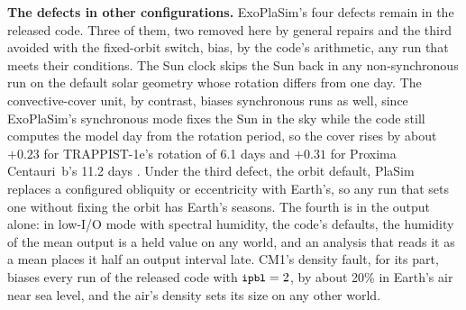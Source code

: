 \textbf{The defects in other configurations.} ExoPlaSim's four defects remain in the released code. Three of them,
two removed here by general repairs and the third avoided with the fixed-orbit switch, bias, by the code's
arithmetic, any run that meets their conditions. The Sun clock skips the Sun back in any non-synchronous run on the default solar geometry whose
rotation differs from one day. The convective-cover unit, by contrast, biases synchronous runs as well, since
ExoPlaSim's synchronous mode fixes the Sun in the sky while the code still computes the model day from the rotation period, so
the cover rises by about $+0.23$ for TRAPPIST-1e's rotation of 6.1 days
\autocite{yang2023cloud} and $+0.31$ for Proxima Centauri~b's 11.2 days \autocite{boutle2017exploring}. Under the third defect, the orbit default, PlaSim replaces a configured obliquity or eccentricity with Earth's, so any run that sets one without fixing the orbit has Earth's seasons. The fourth is in the output alone: in
low-I/O mode with spectral humidity, the code's defaults, the humidity of the mean output is a held value on any
world, and an analysis that reads it as a mean places it half an output interval late. CM1's density fault, for its part,
biases every run of the released code with $\texttt{\small ipbl} = 2$, by about 20\% in Earth's air near sea level, and the
air's density sets its size on any other world.

